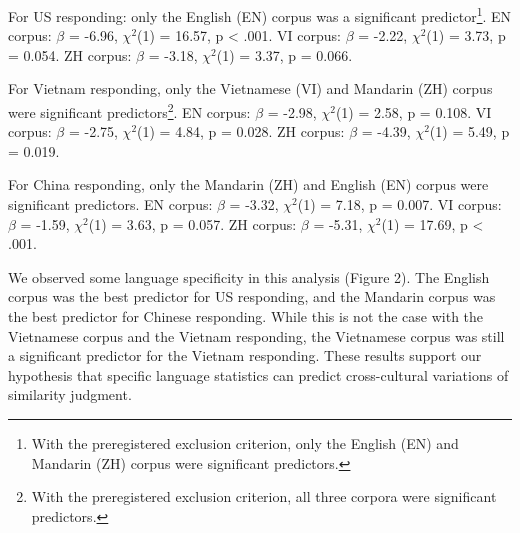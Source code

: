 \documentclass[10pt, letterpaper]{article}
\begin{document}
For US responding: only the English (EN) corpus was a significant
predictor\footnote{With the preregistered exclusion criterion, only the
  English (EN) and Mandarin (ZH) corpus were significant predictors.}.
EN corpus: \(\beta\) = -6.96, \(\chi^2\)(1) = 16.57, p \textless{} .001.
VI corpus: \(\beta\) = -2.22, \(\chi^2\)(1) = 3.73, p = 0.054. ZH
corpus: \(\beta\) = -3.18, \(\chi^2\)(1) = 3.37, p = 0.066.

For Vietnam responding, only the Vietnamese (VI) and Mandarin (ZH)
corpus were significant predictors\footnote{With the preregistered
  exclusion criterion, all three corpora were significant predictors.}.
EN corpus: \(\beta\) = -2.98, \(\chi^2\)(1) = 2.58, p = 0.108. VI
corpus: \(\beta\) = -2.75, \(\chi^2\)(1) = 4.84, p = 0.028. ZH corpus:
\(\beta\) = -4.39, \(\chi^2\)(1) = 5.49, p = 0.019.

For China responding, only the Mandarin (ZH) and English (EN) corpus
were significant predictors. EN corpus: \(\beta\) = -3.32, \(\chi^2\)(1)
= 7.18, p = 0.007. VI corpus: \(\beta\) = -1.59, \(\chi^2\)(1) = 3.63, p
= 0.057. ZH corpus: \(\beta\) = -5.31, \(\chi^2\)(1) = 17.69, p
\textless{} .001.

We observed some language specificity in this analysis (Figure 2). The
English corpus was the best predictor for US responding, and the
Mandarin corpus was the best predictor for Chinese responding. While
this is not the case with the Vietnamese corpus and the Vietnam
responding, the Vietnamese corpus was still a significant predictor for
the Vietnam responding. These results support our hypothesis that
specific language statistics can predict cross-cultural variations of
similarity judgment.
\end{document}
